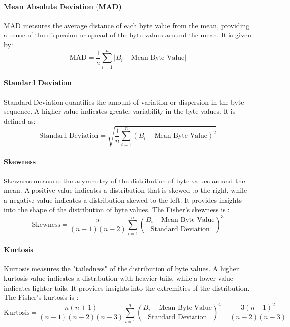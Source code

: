         \paragraph{Mean Absolute Deviation (MAD)}MAD measures the average distance of each byte value from the mean, providing a sense of the dispersion or spread of the byte values around the mean. It is given by:
        \begin{equation}
        \text{MAD} = \frac{1}{n} \sum_{i=1}^{n} |B_i - \text{Mean Byte Value}|
        \label{eq:mad}
        \end{equation}

        \paragraph{Standard Deviation}Standard Deviation quantifies the amount of variation or dispersion in the byte sequence. A higher value indicates greater variability in the byte values. It is defined as:
        \begin{equation}
        \text{Standard Deviation} = \sqrt{\frac{1}{n} \sum_{i=1}^{n} (B_i - \text{Mean Byte Value})^2}
        \label{eq:standard_deviation}
        \end{equation}

        \paragraph{Skewness}Skewness\cite{wheeler_problems_2011} measures the asymmetry of the distribution of byte values around the mean. A positive value indicates a distribution that is skewed to the right, while a negative value indicates a distribution skewed to the left. It provides insights into the shape of the distribution of byte values. The Fisher’s skewness\cite{cain_univariate_2017} is :
        \begin{equation}
        \text{Skewness} = \frac{n}{(n-1)(n-2)} \sum_{i=1}^{n} \left( \frac{B_i - \text{Mean Byte Value}}{\text{Standard Deviation}} \right)^3
        \label{eq:skewness}
        \end{equation}

        \paragraph{Kurtosis}Kurtosis\cite{wheeler_problems_2011} measures the "tailedness" of the distribution of byte values. A higher kurtosis value indicates a distribution with heavier tails, while a lower value indicates lighter tails. It provides insights into the extremities of the distribution. The Fisher’s kurtosis\cite{cain_univariate_2017} is :
        \begin{equation}
        \text{Kurtosis} = \frac{n(n+1)}{(n-1)(n-2)(n-3)} \sum_{i=1}^{n} \left( \frac{B_i - \text{Mean Byte Value}}{\text{Standard Deviation}} \right)^4 - \frac{3(n-1)^2}{(n-2)(n-3)}
        \label{eq:kurtosis}
        \end{equation}

